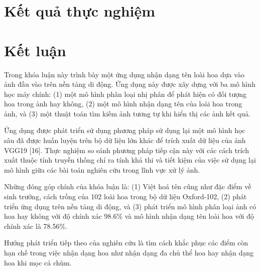 \documentclass[12pt]{report}
\begin{document}
						
						
						
						
						
						
						
		\chapter{Kết quả thực nghiệm}
		\label{chap:Experimental results}
										
		\chapter{Kết luận}
		\label{chap:conclusion}
										
		Trong khóa luận này trình bày một ứng dụng nhận dạng tên loài hoa dựa vào ảnh đầu vào trên nền tảng di động. Ứng dụng này được xây dựng với ba mô hình học máy chính: (1) một mô hình phân loại nhị phân để phát hiện có đối tượng hoa trong ảnh hay không, (2) một mô hình nhận dạng tên của loài hoa trong ảnh, và (3) một thuật toán tìm kiếm ảnh tương tự khi hiển thị các ảnh kết quả. 
										
		Ứng dụng được phát triển sử dụng phương pháp sử dụng lại một mô hình học sâu đã được huấn luyện trên bộ dữ liệu lớn khác để trích xuất dữ liệu của ảnh VGG19 [16]. Thực nghiệm so sánh phương pháp tiếp cận này với các cách trích xuất thuộc tính truyền thống chỉ ra tính khả thi và tiết kiệm của việc sử dụng lại mô hình giữa các bài toán nghiên cứu trong lĩnh vực xử lý ảnh.
										
		Những đóng góp chính của khóa luận là: (1) Việt hoá tên cũng như đặc điểm về sinh trưởng, cách trồng của 102 loài hoa trong bộ dữ liệu Oxford-102, (2) phát triển ứng dụng trên nền tảng di động, và (3) phát triển mô hình phân loại ảnh có hoa hay không với độ chính xác 98.6\% và mô hình nhận dạng tên loài hoa với độ chính xác là 78.56\%.
										
		Hướng phát triển tiếp theo của nghiên cứu là  tìm cách khắc phục các điểm còn hạn chế trong việc nhận dạng hoa như nhận dạng đa chủ thể hoa hay nhận dạng hoa khi mọc cả chùm.															
																								
\end{document}
